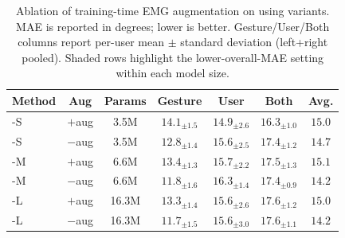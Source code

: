 \begin{table}[h]
\centering
\caption{Ablation of training-time EMG augmentation on \dataset{} using \model{} variants. MAE is reported in degrees; lower is better. Gesture/User/Both columns report per-user mean $\pm$ standard deviation (left+right pooled). Shaded rows highlight the lower-overall-MAE setting within each model size.}
\label{tab:egoemg_aug_ablation}
\footnotesize
\setlength{\tabcolsep}{3.5pt}
\renewcommand{\arraystretch}{1.05}
\begin{tabular}{lcccccc}
\toprule
Method & Aug & Params & Gesture & User & Both & Avg. \\
\midrule
\model{}-S & $+$aug & 3.5M & $14.1_{\pm1.5}$ & $\mathbf{14.9_{\pm2.6}}$ & $\mathbf{16.3_{\pm1.0}}$ & $15.0$ \\
\rowcolor{green!8}
\model{}-S & $-$aug & 3.5M & $\mathbf{12.8_{\pm1.4}}$ & $15.6_{\pm2.5}$ & $17.4_{\pm1.2}$ & $\mathbf{14.7}$ \\
\midrule
\model{}-M & $+$aug & 6.6M & $13.4_{\pm1.3}$ & $\mathbf{15.7_{\pm2.2}}$ & $17.5_{\pm1.3}$ & $15.1$ \\
\rowcolor{green!8}
\model{}-M & $-$aug & 6.6M & $\mathbf{11.8_{\pm1.6}}$ & $16.3_{\pm1.4}$ & $\mathbf{17.4_{\pm0.9}}$ & $\mathbf{14.2}$ \\
\midrule
\model{}-L & $+$aug & 16.3M & $13.3_{\pm1.4}$ & $15.6_{\pm2.6}$ & $17.6_{\pm1.2}$ & $15.0$ \\
\rowcolor{green!8}
\model{}-L & $-$aug & 16.3M & $\mathbf{11.7_{\pm1.5}}$ & $15.6_{\pm3.0}$ & $17.6_{\pm1.1}$ & $\mathbf{14.2}$ \\
\bottomrule
\end{tabular}
\end{table}